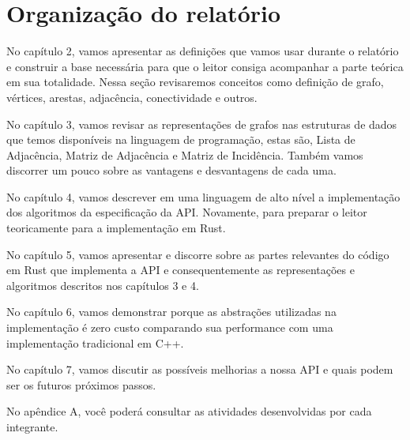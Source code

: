 \section{Organização do relatório}

No capítulo 2, vamos apresentar as definições que vamos usar durante
o relatório e construir a base necessária para que o leitor consiga
acompanhar a parte teórica em sua totalidade. Nessa seção revisaremos conceitos
como definição de grafo, vértices, arestas, adjacência,
conectividade e outros.

No capítulo 3, vamos revisar as representações de grafos nas
estruturas de dados que temos disponíveis na linguagem de
programação, estas são, Lista de Adjacência, Matriz de Adjacência e
Matriz de Incidência. Também vamos discorrer um pouco sobre as
vantagens e desvantagens de cada uma.

No capítulo 4, vamos descrever em uma linguagem de alto nível a
implementação dos algoritmos da especificação da API. Novamente, para
preparar o leitor teoricamente para a implementação em Rust.

No capítulo 5, vamos apresentar e discorre sobre as partes relevantes
do código em Rust que implementa a API e consequentemente as representações e
algoritmos descritos nos capítulos 3 e 4.

No capítulo 6, vamos demonstrar porque as abstrações utilizadas na
implementação é zero custo comparando sua performance com uma
implementação tradicional em C++.

No capítulo 7, vamos discutir as possíveis melhorias a nossa API e quais
podem ser os futuros próximos passos.

No apêndice A, você poderá consultar as atividades desenvolvidas por
cada integrante.
